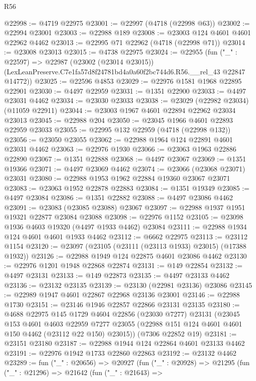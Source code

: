 \begin{lexlean}{R56}
\begin{coremodule}
@22998 := @4719 @22975
@23001 := @22997 (@4718 (@22998 @63))
@23002 := @22994 @23001
@23003 := @22988 @189
@23008 := @23003 @124 @4601 @4601 @22962 @4462
@23013 := @22995 @71 @22962 (@4718 (@22998 @71))
@23014 := @23008 @23013
@23015 := @4738 @22975
@23024 := @22955
    (fun ("_" : @22597) =>
    @22987
      (@23002 (@23014 @23015))
      (LexLeanPreserve.C7e1fa57d8f24781bd4a0a60f2bc744d6.R56.__rel_43 @22847 @14772))
@23025 := @22596 @4853
@23029 := @22976 @1581 @1968 @22895 @22901
@23030 := @4497 @22959
@23031 := @1351 @22900
@23033 := @4497 @23031 @4462
@23034 := @23030 @23033
@23038 := @23029 (@22982 @23034) (@11059 @22911)
@23044 := @23003 @1967 @4601 @22894 @22962 @23034 @23013
@23045 := @22988 @204
@23050 := @23045 @1966 @4601 @22893 @22959 @23033
@23055 := @22995 @132 @22959 (@4718 (@22998 @132))
@23056 := @23050 @23055
@23062 := @22988 @1964 @124 @22891 @4601 @23031 @4462
@23063 := @22976 @1930
@23066 := @23063 @1963 @22886 @22890
@23067 := @1351 @22888
@23068 := @4497 @23067
@23069 := @1351 @19366
@23071 := @4497 @23069 @4462
@23074 := @23066 (@23068 @23071) @23031
@23080 := @22988 @1953 @1962 @22884 @19360 @23067 @23071
@23083 := @23063 @1952 @22878 @22883
@23084 := @1351 @19349
@23085 := @4497 @23084
@23086 := @1351 @22882
@23088 := @4497 @23086 @4462
@23091 := @23083 (@23085 @23088) @23067
@23097 := @22988 @1937 @1951 @19321 @22877 @23084 @23088
@23098 := @22976 @1152
@23105 := @23098 @1936 @4603 @19320 (@4497 @1933 @4462) @23084
@23111 := @22988 @1934 @124 @4601 @4601 @1933 @4462
@23112 := @6662 @22975
@23113 := @23112 @1154
@23120 := @23097 (@23105 (@23111 (@23113 @1933) @23015) (@17388 @1932))
@23126 := @22988 @1949 @124 @22875 @4601 @23086 @4462
@23130 := @22976 @1201 @1948 @22868 @22874
@23131 := @149 @22854
@23132 := @4497 @23131
@23133 := @149 @22873
@23135 := @4497 @23133 @4462
@23136 := @23132 @23135
@23139 := @23130 (@22981 @23136) @23086
@23145 := @22989 @1947 @4601 @22867 @22968 @23136 @23001
@23146 := @22988 @1730
@23151 := @23146 @1946 @22857 @22866 @23131 @23135
@23180 := @4688
    @22975
    @145
    @1729
    @4604
    @22856
    (@23030 @7277)
    @23131
    (@23045
      @153
      @4601
      @4603
      @22959
      @7277
      @23055
      (@22988 @151 @124 @4601 @4601 @150 @4462 (@23112 @22 @150) @23015))
    (@7306 @22852 @19)
@23181 := @23151 @23180
@23187 := @22988 @1944 @124 @22864 @4601 @23133 @4462
@23191 := @22976 @1942 @1733 @22860 @22863
@23192 := @23132 @4462
@23289 := fun ("_" : @20656) =>
  @20927
    (fun ("_" : @20928) =>
    @21295
      (fun ("_" : @21296) =>
      @21642
        (fun ("_" : @21643) =>

\end{coremodule}
\end{lexlean}
